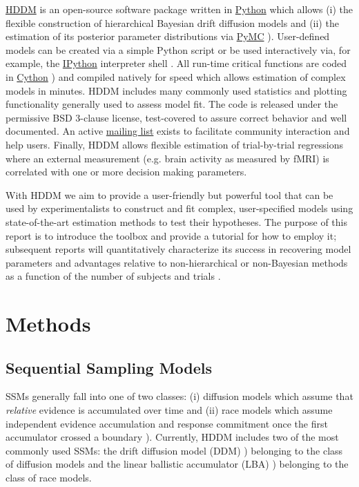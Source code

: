 \documentclass[letterpaper,10pt,english]{article}
\begin{document}
\href{http://github.com/twiecki/hddm}{HDDM} is an open-source software package written in \href{http://www.python.org/}{Python} which allows (i) the flexible construction of hierarchical Bayesian drift diffusion models and (ii) the estimation of its posterior parameter distributions via \href{http://code.google.com/p/pymc/}{PyMC} \citep{PatilHuardFonnesbeck10}). User-defined models can be created via a simple Python script or be used interactively via, for example, the \href{http://ipython.org}{IPython} interpreter shell \citep{PerezGranger07}. All run-time critical functions are coded in \href{http://www.cython.org/}{Cython} \citep{BehnelBradshawCitroEtAl11}) and compiled natively for speed which allows estimation of complex models in minutes. HDDM includes many commonly used statistics and plotting functionality generally used to assess model fit. The code is released under the permissive BSD 3-clause license, test-covered to assure correct behavior and well documented. An active \href{https://groups.google.com/group/hddm-users/}{mailing list} exists to facilitate community interaction and help users. Finally, HDDM allows flexible estimation of trial-by-trial regressions where an external measurement (e.g. brain activity as measured by fMRI) is correlated with one or more decision making
parameters.

With HDDM we aim to provide a user-friendly but powerful tool that can
be used by experimentalists to construct and fit complex,
user-specified models using state-of-the-art estimation methods to
test their hypotheses. The purpose of this report is to introduce the
toolbox and provide a tutorial for how to employ it; subsequent
reports will quantitatively characterize its success in recovering
model parameters and advantages relative to non-hierarchical or
non-Bayesian methods as a function of the number of subjects and
trials \citep{SoferWieckiFrank}.


\section*{Methods}
\label{methods:ipython}\label{methods:index-0}\label{methods::doc}\label{methods:methods}\label{methods:chap-methods}

\subsection*{Sequential Sampling Models}
\label{methods:sequential-sampling-models}
SSMs generally fall into one of two classes: (i) diffusion models
which assume that \emph{relative} evidence is accumulated over time
and (ii) race models which assume independent evidence accumulation
and response commitment once the first accumulator crossed a boundary
\citep{LaBerge62,Vickers70}). Currently, HDDM includes two of the most
commonly used SSMs: the drift diffusion model (DDM)
\citep{RatcliffRouder98,RatcliffMcKoon08}) belonging to the
class of diffusion models and the linear ballistic accumulator (LBA)
\citep{BrownHeathcote08}) belonging to the class of race models.
\end{document}
